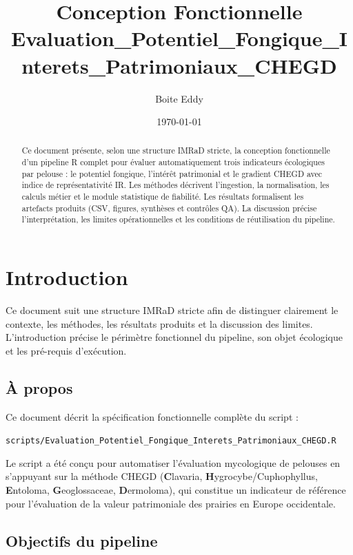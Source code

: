 \documentclass[11pt,a4paper]{article}
\title{Conception Fonctionnelle\\
\large Evaluation\_Potentiel\_Fongique\_Interets\_Patrimoniaux\_CHEGD}
\author{Boite Eddy}
\date{\today}
\begin{document}
\maketitle

\begin{abstract}
Ce document présente, selon une structure IMRaD stricte, la conception fonctionnelle d'un
pipeline R complet pour évaluer automatiquement trois indicateurs écologiques par pelouse :
le potentiel fongique, l'intérêt patrimonial et le gradient CHEGD avec indice de
représentativité IR. Les méthodes décrivent l'ingestion, la normalisation, les calculs métier
et le module statistique de fiabilité. Les résultats formalisent les artefacts produits
(CSV, figures, synthèses et contrôles QA). La discussion précise l'interprétation, les limites
opérationnelles et les conditions de réutilisation du pipeline.
\end{abstract}
\tableofcontents
\newpage

\section{Introduction}
Ce document suit une structure IMRaD stricte afin de distinguer clairement le contexte,
les méthodes, les résultats produits et la discussion des limites. L'introduction précise
le périmètre fonctionnel du pipeline, son objet écologique et les pré-requis d'exécution.

\subsection{À propos}

Ce document décrit la spécification fonctionnelle complète du script :

\begin{center}
  \texttt{scripts/Evaluation\_Potentiel\_Fongique\_Interets\_Patrimoniaux\_CHEGD.R}
\end{center}

Le script a été conçu pour automatiser l'évaluation mycologique de pelouses en s'appuyant sur
la méthode CHEGD (\textbf{C}lavaria, \textbf{H}ygrocybe/Cuphophyllus, \textbf{E}ntoloma,
\textbf{G}eoglossaceae, \textbf{D}ermoloma), qui constitue un indicateur de référence pour
l'évaluation de la valeur patrimoniale des prairies en Europe occidentale.

\subsection{Objectifs du pipeline}
\end{document}
